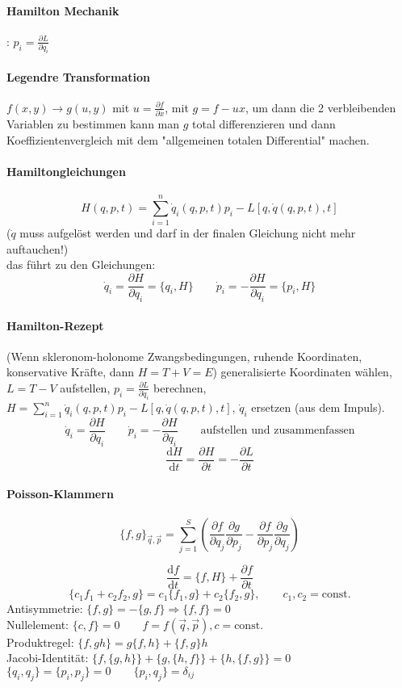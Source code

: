 \documentclass[a4paper, 11pt, fleqn]{article}
\renewcommand{\vec}{\overrightarrow}
\newcommand{\const}{\mathrm{const.}}
\newcommand{\md}{\mathrm{d}}
\newcommand{\pd}[2]{\frac{\partial #1}{\partial #2}}
\newcommand{\ad}[2]{\frac{\md #1}{\md #2}}
\begin{document}
\begin{multicols}{2}
\paragraph{Hamilton Mechanik}: $p_i = \pd{L}{\dot q_i}$
\paragraph{Legendre Transformation} $f(x,y) \to g(u,y)$ mit $u = \pd{f}{x} $, mit $g=f-ux$, um dann die 2 verbleibenden Variablen zu bestimmen kann man $g$ total differenzieren und dann Koeffizientenvergleich mit dem "allgemeinen totalen Differential" machen.

\paragraph{Hamiltongleichungen}
\[H(q,p,t) = \sum\limits_{i=1}^n\dot q_i(q,p,t)p_i-L[q,\dot q(q,p,t),t]\]
($\dot q$ muss aufgelöst werden und darf in der finalen Gleichung nicht mehr auftauchen!)\\
das führt zu den Gleichungen:
\[\dot q_i = \pd{H}{q_i} = \{q_i, H\} \qquad \dot p_i = -\pd{H}{q_i} = \{p_i, H\}\]
\paragraph{Hamilton-Rezept}
(Wenn skleronom-holonome Zwangsbedingungen, ruhende Koordinaten, konservative Kräfte, dann $H=T+V=E$)
generalisierte Koordinaten wählen, $L = T - V$ aufstellen, $p_i = \pd{L}{\dot q_i}$ berechnen, $H=\sum\limits_{i=1}^n\dot q_i(q,p,t)p_i-L[q,\dot q(q,p,t),t]$, $\dot q_i$ ersetzen (aus dem Impuls).
\[\dot q_i = \pd{H}{q_i} \qquad \dot p_i = -\pd{H}{q_i} \qquad \text{aufstellen und zusammenfassen}\]
\[\ad{H}{t}=\pd{H}{t} =-\pd{L}{t}\]

\paragraph{Poisson-Klammern}
\[\{f,g\}_{\vec q, \vec p} = \sum\limits_{j=1}^S \left(\frac{\partial f}{\partial q_j}\frac{\partial g}{\partial p_j} - \frac{\partial f}{\partial p_j}\frac{\partial g}{\partial q_j} \right)\]

\[\ad{f}{t} = \{f,H\} + \pd{f}{t}\]
\[\{c_1f_1+c_2f_2,g\} = c_1\{f_1,g\} + c_2\{f_2,g\}, \qquad c_1,c_2=\const\]
Antisymmetrie: $\{f,g\} = -\{g,f\} \Rightarrow \{f,f\}=0$\\
Nullelement: $\{c,f\} = 0 \qquad f=f(\vec q, \vec p), c=\const$\\
Produktregel: $\{f,gh\} = g\{f,h\} + \{f,g\}h$\\
Jacobi-Identität: $\{f,\{g,h\}\} + \{g,\{h,f\}\} + \{h,\{f,g\}\} = 0$\\
$\{q_i,q_j\} = \{p_i,p_j\} = 0 \qquad \{p_i,q_j\} = \delta_{ij}$

\end{multicols}
\end{document}
